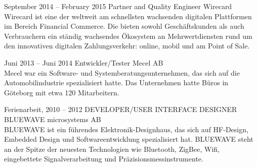 \documentclass[fontsize=10pt]{tccv}
\begin{document}
\begin{eventlist}
\item{September 2014 -- February 2015}
      {Partner and Quality Engineer}
      {Wirecard}
\\
Wirecard ist eine der weltweit am schnellsten wachsenden digitalen Plattformen
im Bereich Financial Commerce. Die bieten sowohl Geschäftskunden als
auch Verbrauchern ein ständig wachsendes Ökosystem an Mehrwertdiensten
rund um den innovativen digitalen Zahlungsverkehr: online, mobil und am
Point of Sale.

\newpage

\item{Juni 2013 -- Juni 2014}
     {Entwickler/Tester}
     {Mecel AB}
\\
Mecel war ein Software- und Systemberatungsunternehmen, das sich auf die
Automobilindustrie spezialisiert hatte. Das Unternehmen hatte Büros in
Göteborg mit etwa 120 Mitarbeitern.

\item{Ferienarbeit, 2010 -- 2012}
     {DEVELOPER/USER INTERFACE DESIGNER}
     {BLUEWAVE microsystems AB}
\\
BLUEWAVE ist ein führendes Elektronik-Designhaus, das sich auf HF-Design,
Embedded Design und Softwareentwicklung spezialisiert hat. BLUEWAVE steht an
der Spitze der neuesten Technologien wie Bluetooth, ZigBee, Wifi, eingebettete
Signalverarbeitung und Präzisionsmessinstrumente.

\end{eventlist}
\end{document}
